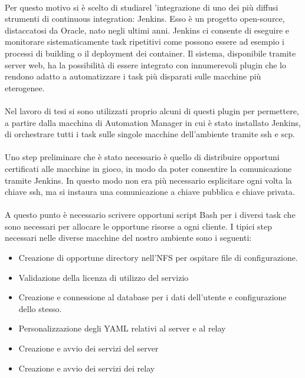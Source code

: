 \paragraph{}
Per questo motivo si è scelto di studiarel 'integrazione di uno dei più diffusi strumenti di continuous integration: Jenkins. Esso è un progetto open-source, distaccatosi da Oracle, nato negli ultimi anni. Jenkins ci consente di eseguire e monitorare sistematicamente task ripetitivi come possono essere ad esempio i processi di building o il deployment dei container. Il sistema, disponibile tramite server web, ha la possibilità di essere integrato con innumerevoli plugin che lo rendono adatto a automatizzare i task più disparati sulle macchine più eterogenee. 
\paragraph{}
Nel lavoro di tesi si sono utilizzati proprio alcuni di questi plugin per permettere, a partire dalla macchina di Automation Manager in cui è stato installato Jenkins, di orchestrare tutti i task sulle singole macchine dell'ambiente tramite ssh e scp.
\paragraph{}
Uno step preliminare che è stato necessario è quello di distribuire opportuni certificati alle macchine in gioco, in modo da poter consentire la comunicazione tramite Jenkins. In questo modo non era più necessario esplicitare ogni volta la chiave ssh, ma si instaura una comunicazione a chiave pubblica e chiave privata. 
\paragraph{}
A questo punto è necessario scrivere opportuni script Bash per i diversi task che sono necessari per allocare le opportune risorse a ogni cliente. I tipici step necessari nelle diverse macchine del nostro ambiente sono i seguenti:
\begin{itemize}
	\item Creazione di opportune directory nell'NFS per ospitare file di configurazione.
	\item Validazione della licenza di utilizzo del servizio 
	\item Creazione e connessione al database per i dati dell'utente e configurazione dello stesso.
	\item Personalizzazione degli YAML relativi al server e al relay
	\item Creazione e avvio dei servizi del server
	\item Creazione e avvio dei servizi dei relay
\end{itemize}
